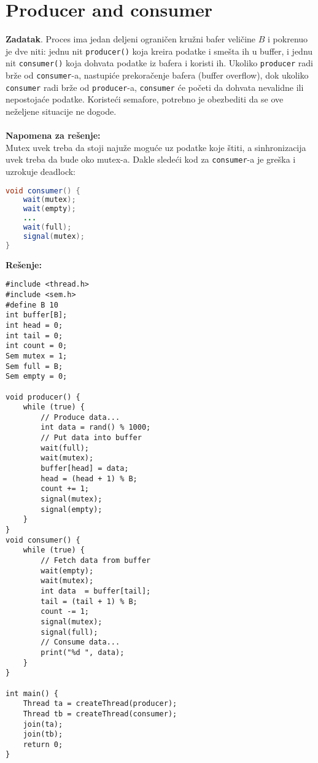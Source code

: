 \clearpage
\section{Producer and consumer}
\textbf{\large Zadatak}. Proces ima jedan deljeni ograni\v{c}en kru\v{z}ni bafer veli\v{c}ine $B$ i pokrenuo je dve niti: jednu nit \texttt{producer()} koja kreira podatke i sme\v{s}ta ih u buffer, i jednu nit \texttt{consumer()} koja dohvata podatke iz bafera i koristi ih. Ukoliko \texttt{producer} radi br\v{z}e od \texttt{consumer}-a, nastupi\'{c}e prekora\v{c}enje bafera (buffer overflow), dok ukoliko \texttt{consumer} radi br\v{z}e od \texttt{producer}-a, \texttt{consumer} \'{c}e po\v{c}eti da dohvata nevalidne ili nepostoja\'{c}e podatke. Koriste\'{c}i semafore, potrebno je obezbediti da se ove ne\v{z}eljene situacije ne dogode.
\\\\
\textbf{Napomena za re\v{s}enje:}\\
Mutex uvek treba da stoji naju\v{z}e mogu\'{c}e uz podatke koje \v{s}titi, a sinhronizacija uvek treba da bude oko mutex-a. Dakle slede\'{c}i kod za \texttt{consumer}-a je gre\v{s}ka i uzrokuje deadlock:
\begin{lstlisting}[language=java]
void consumer() {
    wait(mutex); 
    wait(empty);
    ...
    wait(full);
    signal(mutex);
}
\end{lstlisting}
\textbf{\large Re\v{s}enje:}
\begin{lstlisting}
#include <thread.h>
#include <sem.h>
#define B 10
int buffer[B];
int head = 0;
int tail = 0;
int count = 0;
Sem mutex = 1;
Sem full = B;
Sem empty = 0;

void producer() {
    while (true) {
        // Produce data...
        int data = rand() % 1000;
        // Put data into buffer
        wait(full);
        wait(mutex);
        buffer[head] = data;
        head = (head + 1) % B;
        count += 1;
        signal(mutex);
        signal(empty);
    }
}
void consumer() {
    while (true) {
        // Fetch data from buffer
        wait(empty);
        wait(mutex);
        int data  = buffer[tail];
        tail = (tail + 1) % B;
        count -= 1;
        signal(mutex);
        signal(full);
        // Consume data... 
        print("%d ", data);
    }
}

int main() {
    Thread ta = createThread(producer);
    Thread tb = createThread(consumer);
    join(ta);
    join(tb);
    return 0;
}

\end{lstlisting}